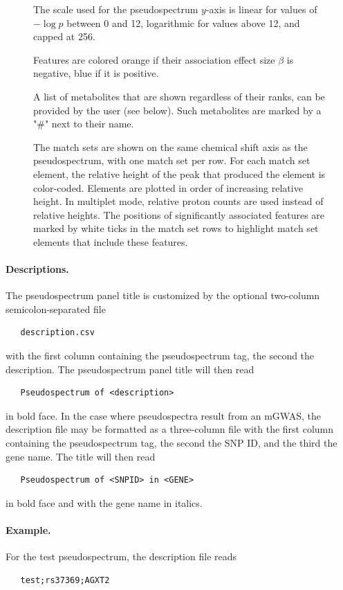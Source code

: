 \documentclass[a4paper,11pt]{article}
\begin{document}
\begin{figure}
{\begin{description}[align=left,noitemsep,labelwidth=7.2mm]
\item[D.] The scale used for the pseudospectrum $y$-axis is linear for values of $-\log p$ between 0 and 12, logarithmic for values above 12, and capped at 256.
\item[E.] Features are colored orange if their association effect size $\beta$ is negative,  blue if it is positive.
\item[F.] A list of metabolites that are shown regardless of their ranks, can be provided by the user (see below). Such metabolites are marked by a "\#" next to their name.
\item[G, H.] The match sets are shown on the same chemical shift axis as the pseudospectrum, with one match set per row. For each match set element, the relative height of the peak that produced the element is color-coded. Elements are plotted in order of increasing relative height. In multiplet mode, relative proton counts are used instead of relative heights. The positions of significantly associated features are marked by white ticks in the match set rows to highlight match set elements that include these features.
\end{description} %
}
\end{figure}
\paragraph{Descriptions.} The pseudospectrum panel title is customized by the optional two-column semicolon-separated file
\begin{verbatim}
   description.csv
\end{verbatim}
with the first column containing the pseudospectrum tag, the second the description. The pseudospectrum panel title will then read
\begin{verbatim}
   Pseudospectrum of <description>
\end{verbatim}
in bold face. In the case where pseudospectra result from an mGWAS, the description file may be formatted as a three-column file with the first column containing the pseudospectrum tag, the second the SNP ID, and the third the gene name. The title will then read
\begin{verbatim}
   Pseudospectrum of <SNPID> in <GENE>
\end{verbatim}
in bold face and with the gene name in italics.
\paragraph{Example.} For the test pseudospectrum, the description file reads
\begin{verbatim}
   test;rs37369;AGXT2
\end{verbatim}
\end{document}
